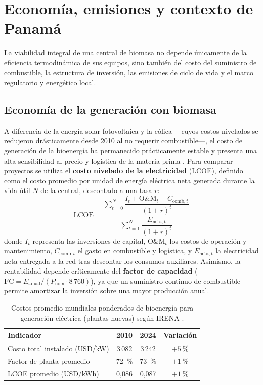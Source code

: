 \chapter{Economía, emisiones y contexto de Panamá}
\label{cap:economia_panama}

La viabilidad integral de una central de biomasa no depende únicamente de la eficiencia termodinámica de sus equipos, sino también del costo del suministro de combustible, la estructura de inversión, las emisiones de ciclo de vida y el marco regulatorio y energético local.

\section{Economía de la generación con biomasa}
\label{sec:economia}

A diferencia de la energía solar fotovoltaica y la eólica ---cuyos costos nivelados se redujeron drásticamente desde 2010 al no requerir combustible---, el costo de generación de la bioenergía ha permanecido prácticamente estable y presenta una alta sensibilidad al precio y logística de la materia prima \cite{irena2025costs}. Para comparar proyectos se utiliza el \textbf{costo nivelado de la electricidad} (LCOE), definido como el costo promedio por unidad de energía eléctrica neta generada durante la vida útil $N$ de la central, descontado a una tasa $r$:
\begin{equation}
\mathrm{LCOE} = \frac{\sum_{t=0}^{N} \dfrac{I_t + \mathrm{O\&M}_t + C_{\mathrm{comb},t}}{(1+r)^t}}{\sum_{t=1}^{N} \dfrac{E_{\mathrm{neta},t}}{(1+r)^t}}
\end{equation}
donde $I_t$ representa las inversiones de capital, $\mathrm{O\&M}_t$ los costos de operación y mantenimiento, $C_{\mathrm{comb},t}$ el gasto en combustible y logística, y $E_{\mathrm{neta},t}$ la electricidad neta entregada a la red tras descontar los consumos auxiliares. Asimismo, la rentabilidad depende críticamente del \textbf{factor de capacidad} ($\mathrm{FC} = E_{\mathrm{anual}} / (P_{\mathrm{nom}} \cdot 8\,760)$), ya que un suministro continuo de combustible permite amortizar la inversión sobre una mayor producción anual.

\begin{table}[htbp]
\centering
\caption{Costos promedio mundiales ponderados de bioenergía para generación eléctrica (plantas nuevas) según IRENA \cite{irena2025costs}.}
\label{tab:costos_irena}
\begin{tabular}{@{}lccc@{}}
\toprule
\textbf{Indicador} & \textbf{2010} & \textbf{2024} & \textbf{Variación} \\
\midrule
Costo total instalado (USD/kW) & 3\,082 & 3\,242 & $+5~\%$ \\
Factor de planta promedio & 72~\% & 73~\% & $+1~\%$ \\
LCOE promedio (USD/kWh) & 0,086 & 0,087 & $+1~\%$ \\
\bottomrule
\end{tabular}
\end{table}

